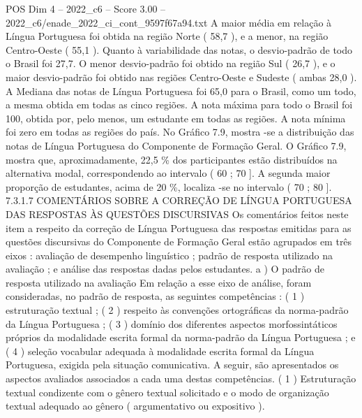 \begin{textsample}{POS Dim 4 – 2022\_c6 – Score 3.00 – 2022\_c6/enade\_2022\_ci\_cont\_9597f67a94.txt}
A maior média em relação à Língua Portuguesa foi obtida na região Norte ( 58,7 ), e a menor, na região Centro-Oeste ( 55,1 ).
Quanto à variabilidade das notas, o desvio-padrão de todo o Brasil foi 27,7.
O menor desvio-padrão foi obtido na região Sul ( 26,7 ), e o maior desvio-padrão foi obtido nas regiões Centro-Oeste e Sudeste ( ambas 28,0 ).
A Mediana das notas de Língua Portuguesa foi 65,0 para o Brasil, como um todo, a mesma obtida em todas as cinco regiões.
A nota máxima para todo o Brasil foi 100, obtida por, pelo menos, um estudante em todas as regiões.
A nota mínima foi zero em todas as regiões do país.
No Gráfico 7.9, mostra -se a distribuição das notas de Língua Portuguesa do Componente de Formação Geral.
O Gráfico 7.9, mostra que, aproximadamente, 22,5 \% dos participantes estão distribuídos na alternativa modal, correspondendo ao intervalo ( 60 ; 70 ].
A segunda maior proporção de estudantes, acima de 20 \%, localiza -se no intervalo ( 70 ; 80 ]. 7.3.1.7 COMENTÁRIOS SOBRE A CORREÇÃO DE LÍNGUA PORTUGUESA DAS RESPOSTAS ÀS QUESTÕES DISCURSIVAS Os comentários feitos neste item a respeito da correção de Língua Portuguesa das respostas emitidas para as questões discursivas do Componente de Formação Geral estão agrupados em três eixos : avaliação de desempenho linguístico ; padrão de resposta utilizado na avaliação ; e análise das respostas dadas pelos estudantes. a ) O padrão de resposta utilizado na avaliação Em relação a esse eixo de análise, foram consideradas, no padrão de resposta, as seguintes competências : ( 1 ) estruturação textual ; ( 2 ) respeito às convenções ortográficas da norma-padrão da Língua Portuguesa ; ( 3 ) domínio dos diferentes aspectos morfossintáticos próprios da modalidade escrita formal da norma-padrão da Língua Portuguesa ; e ( 4 ) seleção vocabular adequada à modalidade escrita formal da Língua Portuguesa, exigida pela situação comunicativa.
A seguir, são apresentados os aspectos avaliados associados a cada uma destas competências. ( 1 ) Estruturação textual condizente com o gênero textual solicitado e o modo de organização textual adequado ao gênero ( argumentativo ou expositivo ).

\end{textsample}
